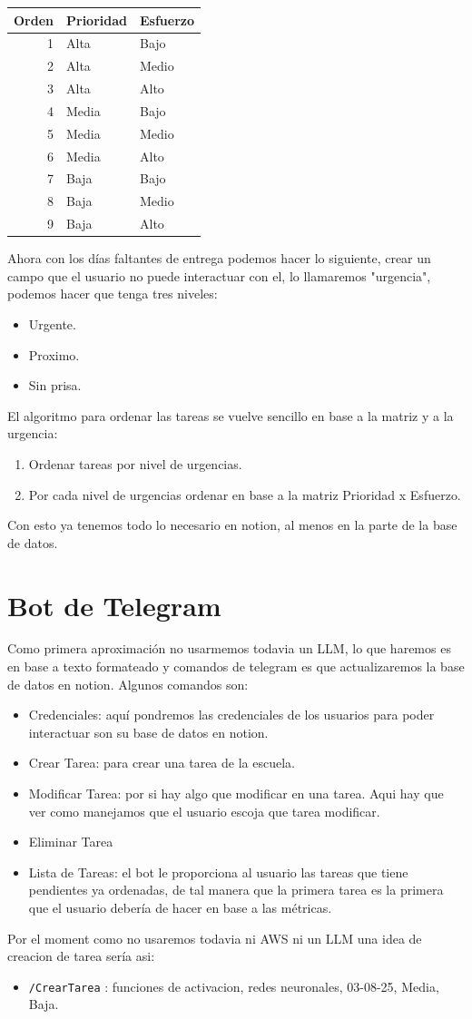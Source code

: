 \documentclass[10pt]{article}
\begin{document}
\begin{center}
\begin{tabular}{rll}
Orden & Prioridad & Esfuerzo\\
\hline
1 & Alta & Bajo\\
2 & Alta & Medio\\
3 & Alta & Alto\\
4 & Media & Bajo\\
5 & Media & Medio\\
6 & Media & Alto\\
7 & Baja & Bajo\\
8 & Baja & Medio\\
9 & Baja & Alto\\
\end{tabular}
\end{center}

Ahora con los días faltantes de entrega podemos hacer lo siguiente, crear un campo que el usuario no
puede interactuar con el, lo llamaremos "urgencia", podemos hacer que tenga tres niveles:
\begin{itemize}
\item Urgente.
\item Proximo.
\item Sin prisa.
\end{itemize}

El algoritmo para ordenar las tareas se vuelve sencillo en base a la matriz y a la urgencia:
\begin{enumerate}
\item Ordenar tareas por nivel de urgencias.
\item Por cada nivel de urgencias ordenar en base a la matriz Prioridad x Esfuerzo.
\end{enumerate}

Con esto ya tenemos todo lo necesario en notion, al menos en la parte de la base de datos.
\section*{Bot de Telegram}
\label{sec:org87bb0d0}

Como primera aproximación no usarmemos todavia un LLM, lo que haremos es en base a texto
formateado y comandos de telegram es que actualizaremos la base de datos en notion. Algunos comandos
son:
\begin{itemize}
\item Credenciales: aquí pondremos las credenciales de los usuarios para poder interactuar son su base de
datos en notion.
\item Crear Tarea: para crear una tarea de la escuela.
\item Modificar Tarea: por si hay algo que modificar en una tarea. Aqui hay que ver como manejamos que el
usuario escoja que tarea modificar.
\item Eliminar Tarea
\item Lista de Tareas: el bot le proporciona al usuario las tareas que tiene pendientes ya ordenadas, de tal
manera que la primera tarea es la primera que el usuario debería de hacer en base a las métricas.
\end{itemize}

Por el moment como no usaremos todavia ni AWS ni un LLM una idea de creacion de tarea sería asi:
\begin{itemize}
\item \texttt{/CrearTarea} : funciones de activacion, redes neuronales, 03-08-25, Media, Baja.
\end{itemize}
\end{document}
